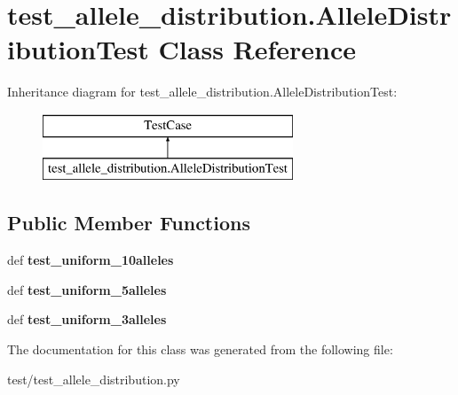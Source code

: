 \hypertarget{classtest__allele__distribution_1_1_allele_distribution_test}{\section{test\-\_\-allele\-\_\-distribution.\-Allele\-Distribution\-Test Class Reference}
\label{classtest__allele__distribution_1_1_allele_distribution_test}
}
Inheritance diagram for test\-\_\-allele\-\_\-distribution.\-Allele\-Distribution\-Test\-:\begin{figure}[H]
\begin{center}
\leavevmode
\includegraphics[height=2.000000cm]{classtest__allele__distribution_1_1_allele_distribution_test}
\end{center}
\end{figure}
\subsection*{Public Member Functions}
\begin{DoxyCompactItemize}
\item 
\hypertarget{classtest__allele__distribution_1_1_allele_distribution_test_a4381a11d850f763aa2654b6097ae79d6}{def {\bfseries test\-\_\-uniform\-\_\-10alleles}}\label{classtest__allele__distribution_1_1_allele_distribution_test_a4381a11d850f763aa2654b6097ae79d6}

\item 
\hypertarget{classtest__allele__distribution_1_1_allele_distribution_test_a12922560389617f45be6481745bcf5c5}{def {\bfseries test\-\_\-uniform\-\_\-5alleles}}\label{classtest__allele__distribution_1_1_allele_distribution_test_a12922560389617f45be6481745bcf5c5}

\item 
\hypertarget{classtest__allele__distribution_1_1_allele_distribution_test_adda324f718f761b0320b793c6c88e3ba}{def {\bfseries test\-\_\-uniform\-\_\-3alleles}}\label{classtest__allele__distribution_1_1_allele_distribution_test_adda324f718f761b0320b793c6c88e3ba}

\end{DoxyCompactItemize}


The documentation for this class was generated from the following file\-:\begin{DoxyCompactItemize}
\item 
test/test\-\_\-allele\-\_\-distribution.\-py\end{DoxyCompactItemize}
